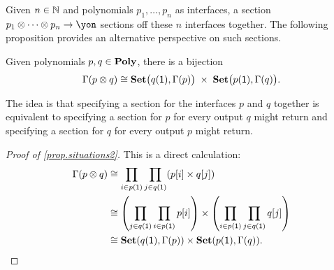 \documentclass[Book-Poly]{subfiles}
\begin{document}

Given $n\in\mathbb{N}$ and polynomials $p_1,\ldots,p_n$ as interfaces, a section $p_1\otimes\cdots\otimes p_n\to\yon$ sections off these $n$ interfaces together.
The following proposition provides an alternative perspective on such sections.

\begin{proposition}\label{prop.situations2}
Given polynomials $p,q\in\mathbf{Poly}$, there is a bijection
\begin{equation} \label{eqn.situations2}
\Gamma(p\otimes q)\cong\mathbf{Set}\big(q(\textsf{1}),\Gamma(p)\big)\;\times\;\mathbf{Set}\big(p(\textsf{1}),\Gamma(q)\big).
\end{equation}
\end{proposition}
The idea is that specifying a section for the interfaces $p$ and $q$ together is equivalent to specifying a section for $p$ for every output $q$ might return and specifying a section for $q$ for every output $p$ might return.
\begin{proof}[Proof of \cref{prop.situations2}]
This is a direct calculation:
\begin{align*}
	\Gamma(p\otimes q) &\cong
	\prod_{i\in p(\textsf{1})}\prod_{j\in q(\textsf{1})}(p[i]\times q[j]) \\
	&\cong
	\left(\prod_{j\in q(\textsf{1})}\prod_{i\in p(\textsf{1})}p[i]\right)\times
		 \left(\prod_{i\in p(\textsf{1})}\prod_{j\in q(\textsf{1})}q[j]\right) \\
	&\cong
	\mathbf{Set}(q(\textsf{1}),\Gamma(p))\times\mathbf{Set}(p(\textsf{1}),\Gamma(q)).
\end{align*}
\end{proof}
\end{document}
